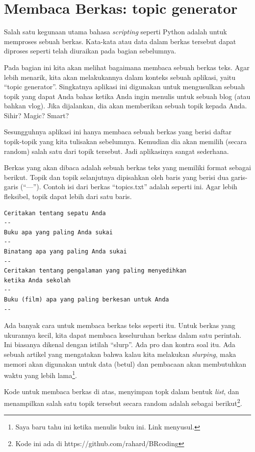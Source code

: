 \section{Membaca Berkas: topic generator}
Salah satu kegunaan utama bahasa {\em scripting} seperti Python adalah
untuk memproses sebuah berkas. Kata-kata atau data dalam berkas tersebut
dapat diproses seperti telah diuraikan pada bagian sebelumnya.

Pada bagian ini kita akan melihat bagaimana membaca sebuah berkas teks.
Agar lebih menarik, kita akan melakukannya dalam konteks sebuah aplikasi,
yaitu ``topic generator''. Singkatnya aplikasi ini digunakan untuk
mengusulkan sebuah topik yang dapat Anda bahas ketika Anda ingin
menulis untuk sebuah blog (atau bahkan vlog).
Jika dijalankan, dia akan memberikan sebuah topik kepada Anda.
Sihir? Magic? Smart?

Sesungguhnya aplikasi ini hanya membaca sebuah berkas yang berisi 
daftar topik-topik yang kita tulisakan sebelumnya. Kemudian dia 
akan memilih (secara random) salah satu dari topik tersebut.
Jadi aplikasinya sangat sederhana. 

Berkas yang akan dibaca adalah sebuah berkas teks yang memiliki
format sebagai berikut. Topik dan topik selanjutnya dipisahkan oleh
baris yang berisi dua garis-garis (``---''). Contoh isi dari
berkas ``topics.txt'' adalah seperti ini.
Agar lebih fleksibel, topik dapat lebih dari satu baris.

\begin{verbatim}
Ceritakan tentang sepatu Anda
--
Buku apa yang paling Anda sukai
--
Binatang apa yang paling Anda sukai
--
Ceritakan tentang pengalaman yang paling menyedihkan
ketika Anda sekolah
--
Buku (film) apa yang paling berkesan untuk Anda
--
\end{verbatim}


Ada banyak cara untuk membaca berkas teks seperti itu.
Untuk berkas yang ukurannya kecil, kita dapat membaca keseluruhan
berkas dalam satu perintah. Ini biasanya dikenal dengan istilah ``slurp''.
Ada pro dan kontra soal itu.
Ada sebuah artikel yang mengatakan bahwa kalau kita melakukan {\em slurping},
maka memori akan digunakan untuk data (betul) dan pembacaan
akan membutuhkan waktu yang lebih lama\footnote{Saya baru tahu ini ketika
menulis buku ini. Link menyusul.}.

Kode untuk membaca berkas di atas, menyimpan topk dalam
bentuk {\em list}, dan menampilkan salah satu topik tersebut
secara random adalah sebagai berikut\footnote{Kode ini ada di 
https://github.com/rahard/BRcoding}.


